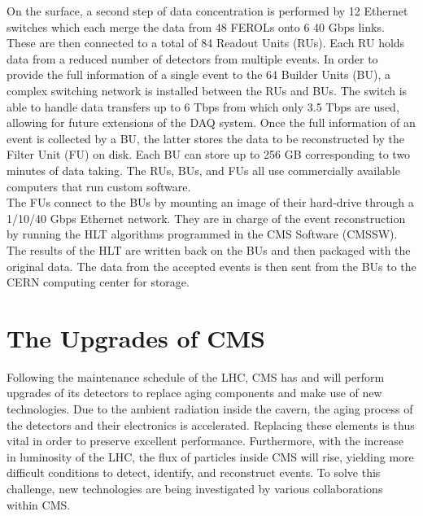     On the surface, a second step of data concentration is performed by 12 Ethernet switches which each merge the data from 48 FEROLs onto 6 40 Gbps links. These are then connected to a total of 84 Readout Units (RUs). Each RU holds data from a reduced number of detectors from multiple events. In order to provide the full information of a single event to the 64 Builder Units (BU), a complex switching network is installed between the RUs and BUs. The switch is able to handle data transfers up to 6 Tbps from which only 3.5 Tbps are used, allowing for future extensions of the DAQ system. Once the full information of an event is collected by a BU, the latter stores the data to be reconstructed by the Filter Unit (FU) on disk. Each BU can store up to 256 GB corresponding to two minutes of data taking. The RUs, BUs, and FUs all use commercially available computers that run custom software. \\

    The FUs connect to the BUs by mounting an image of their hard-drive through a 1/10/40 Gbps Ethernet network. They are in charge of the event reconstruction by running the HLT algorithms programmed in the CMS Software (CMSSW). The results of the HLT are written back on the BUs and then packaged with the original data. The data from the accepted events is then sent from the BUs to the CERN computing center for storage.

  \section{The Upgrades of CMS}

    Following the maintenance schedule of the LHC, CMS has and will perform upgrades of its detectors to replace aging components and make use of new technologies. Due to the ambient radiation inside the cavern, the aging process of the detectors and their electronics is accelerated. Replacing these elements is thus vital in order to preserve excellent performance. Furthermore, with the increase in luminosity of the LHC, the flux of particles inside CMS will rise, yielding more difficult conditions to detect, identify, and reconstruct events. To solve this challenge, new technologies are being investigated by various collaborations within CMS.
